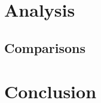 \documentclass{article}
\begin{document}
\section{Analysis}


\subsection{Comparisons}

\section{Conclusion}



\end{document}
